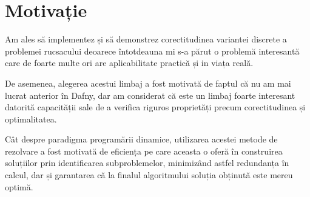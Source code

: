 \chapter*{Motivație} 

Am ales să implementez și să demonstrez corectitudinea variantei discrete a problemei rucsacului deoarece întotdeauna mi s-a părut o problemă interesantă care de foarte multe ori are aplicabilitate practică și in viața reală. \par
De asemenea, alegerea acestui limbaj a fost motivată de faptul că nu am mai lucrat anterior în Dafny, dar am considerat că este un limbaj foarte interesant datorită capacității sale de a verifica riguros proprietăți precum corectitudinea și optimalitatea. \par
Cât despre paradigma programării dinamice, utilizarea acestei metode de rezolvare a fost motivată de eficiența pe care aceasta o oferă în construirea soluțiilor prin identificarea subproblemelor, minimizând astfel redundanța în calcul, dar și garantarea că la finalul algoritmului soluția obținută este mereu optimă.